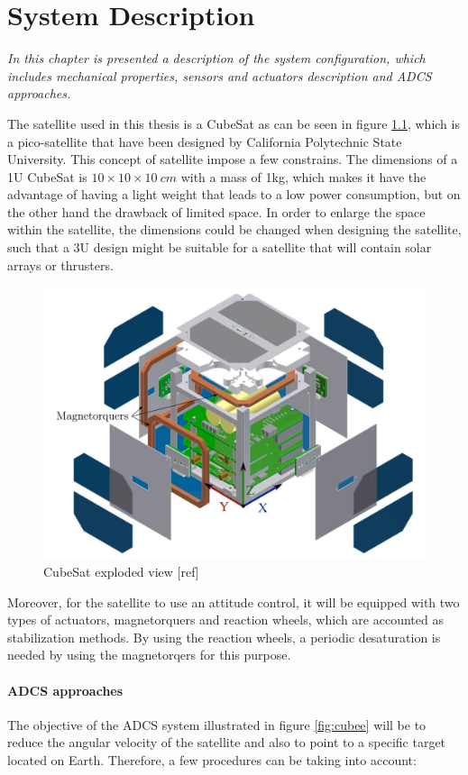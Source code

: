 \chapter{System Description}\label{chap:systemDescribtion}
\textit{In this chapter is presented a description of the system configuration, which includes mechanical properties, sensors and actuators description and ADCS approaches.}

The satellite used in this thesis is a CubeSat as can be seen in figure \ref{fig:cube}, which is a pico-satellite that have been designed by California Polytechnic State University. This concept of satellite impose a few constrains. The dimensions of a 1U CubeSat  is $10 \times 10 \times 10 \ cm$ with a mass of 1kg, which makes it have the advantage of having a light weight that leads to a low power consumption, but on the other hand the drawback of limited space. In order to enlarge the space within the satellite, the dimensions could be changed when designing the satellite, such that a 3U design might be suitable for a satellite that will contain solar arrays or thrusters.

\begin{figure}[H]
	\centering
	\includegraphics[width=0.7\linewidth]{figures/cubesat}
	\caption{CubeSat exploded view [ref]}
	\label{fig:cube}
\end{figure}

Moreover, for the satellite to use an attitude control, it will be equipped with two types of actuators, magnetorquers and reaction wheels, which are accounted as stabilization methods. By using the reaction wheels, a periodic desaturation is needed by using the magnetorqers for this purpose.

\subsubsection{ADCS approaches}
The objective of the ADCS system illustrated in figure \ref{fig:cubee} will be to reduce the angular velocity of the satellite and also to point to a specific target located on Earth. Therefore, a few procedures can be taking into account:


